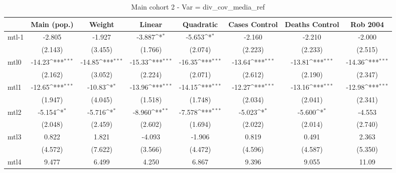 \documentclass{article}
\begin{document}
{
\def\sym#1{\ifmmode^{#1}\else\(^{#1}\)\fi}
\begin{longtable}{l*{7}{c}}
\caption{Main cohort 2 - Var = div\_cov\_media\_ref}\\
\hline\hline\endfirsthead\hline\endhead\hline\endfoot\endlastfoot
                &\multicolumn{1}{c}{Main (pop.)}&\multicolumn{1}{c}{Weight}&\multicolumn{1}{c}{Linear}&\multicolumn{1}{c}{Quadratic}&\multicolumn{1}{c}{Cases Control}&\multicolumn{1}{c}{Deaths Control}&\multicolumn{1}{c}{Rob 2004}\\
\hline
mtl-1           &   -2.805         &   -1.927         &   -3.887\sym{*}  &   -5.653\sym{*}  &   -2.160         &   -2.210         &   -2.000         \\
                &  (2.143)         &  (3.455)         &  (1.766)         &  (2.074)         &  (2.223)         &  (2.233)         &  (2.515)         \\
mtl0            &   -14.23\sym{***}&   -14.85\sym{***}&   -15.33\sym{***}&   -16.35\sym{***}&   -13.64\sym{***}&   -13.81\sym{***}&   -14.36\sym{***}\\
                &  (2.162)         &  (3.052)         &  (2.224)         &  (2.071)         &  (2.612)         &  (2.190)         &  (2.347)         \\
mtl1            &   -12.65\sym{***}&   -10.83\sym{*}  &   -13.96\sym{***}&   -14.15\sym{***}&   -12.27\sym{***}&   -13.16\sym{***}&   -12.98\sym{***}\\
                &  (1.947)         &  (4.045)         &  (1.518)         &  (1.748)         &  (2.034)         &  (2.041)         &  (2.341)         \\
mtl2            &   -5.154\sym{*}  &   -5.716\sym{*}  &   -8.960\sym{**} &   -7.578\sym{***}&   -5.023\sym{*}  &   -5.600\sym{*}  &   -4.553         \\
                &  (2.048)         &  (2.459)         &  (2.602)         &  (1.694)         &  (2.022)         &  (2.014)         &  (2.740)         \\
mtl3            &    0.822         &    1.821         &   -4.093         &   -1.906         &    0.819         &    0.491         &    2.363         \\
                &  (4.572)         &  (7.622)         &  (3.566)         &  (4.472)         &  (4.596)         &  (4.587)         &  (5.350)         \\
mtl4            &    9.477         &    6.499         &    4.250         &    6.867         &    9.396         &    9.055         &    11.09         \\

\end{longtable}}
\end{document}
